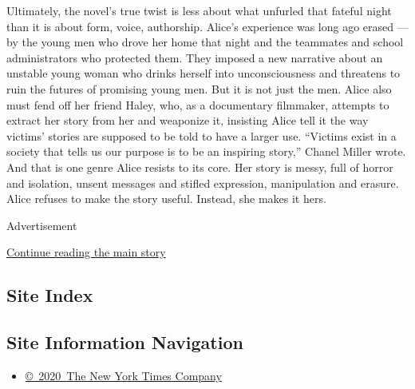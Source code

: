 Ultimately, the novel's true twist is less about what unfurled that
fateful night than it is about form, voice, authorship. Alice's
experience was long ago erased --- by the young men who drove her home
that night and the teammates and school administrators who protected
them. They imposed a new narrative about an unstable young woman who
drinks herself into unconsciousness and threatens to ruin the futures of
promising young men. But it is not just the men. Alice also must fend
off her friend Haley, who, as a documentary filmmaker, attempts to
extract her story from her and weaponize it, insisting Alice tell it the
way victims' stories are supposed to be told to have a larger use.
``Victims exist in a society that tells us our purpose is to be an
inspiring story,'' Chanel Miller wrote. And that is one genre Alice
resists to its core. Her story is messy, full of horror and isolation,
unsent messages and stifled expression, manipulation and erasure. Alice
refuses to make the story useful. Instead, she makes it hers.

Advertisement

\protect\hyperlink{after-bottom}{Continue reading the main story}

\hypertarget{site-index}{%
\subsection{Site Index}\label{site-index}}

\hypertarget{site-information-navigation}{%
\subsection{Site Information
Navigation}\label{site-information-navigation}}

\begin{itemize}
\tightlist
\item
  \href{https://help.nytimes.com/hc/en-us/articles/115014792127-Copyright-notice}{©~2020~The
  New York Times Company}
\end{itemize}

